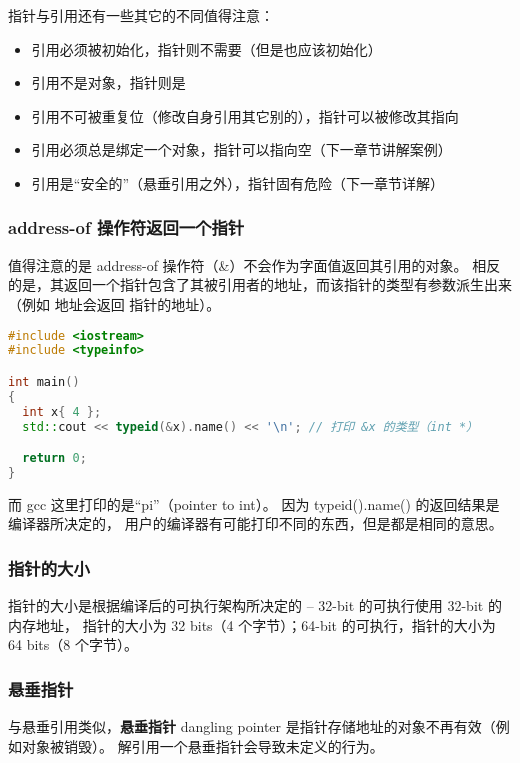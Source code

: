 \documentclass[../../LearnCpp.tex]{subfiles}
\begin{document}
指针与引用还有一些其它的不同值得注意：

\begin{itemize}
  \item 引用必须被初始化，指针则不需要（但是也应该初始化）
  \item 引用不是对象，指针则是
  \item 引用不可被重复位（修改自身引用其它别的），指针可以被修改其指向
  \item 引用必须总是绑定一个对象，指针可以指向空（下一章节讲解案例）
  \item 引用是“安全的”（悬垂引用之外），指针固有危险（下一章节详解）
\end{itemize}

\subsubsection*{address-of 操作符返回一个指针}

值得注意的是 address-of 操作符（\&）不会作为字面值返回其引用的对象。
相反的是，其返回一个指针包含了其被引用者的地址，而该指针的类型有参数派生出来（例如  地址会返回  指针的地址）。

\begin{lstlisting}[language=C++]
#include <iostream>
#include <typeinfo>

int main()
{
  int x{ 4 };
  std::cout << typeid(&x).name() << '\n'; // 打印 &x 的类型（int *）

  return 0;
}
\end{lstlisting}

而 gcc 这里打印的是“pi”（pointer to int）。
因为 typeid().name() 的返回结果是编译器所决定的，
用户的编译器有可能打印不同的东西，但是都是相同的意思。

\subsubsection*{指针的大小}

指针的大小是根据编译后的可执行架构所决定的 -- 32-bit 的可执行使用 32-bit 的内存地址，
指针的大小为 32 bits（4 个字节）；64-bit 的可执行，指针的大小为 64 bits（8 个字节）。

\subsubsection*{悬垂指针}

与悬垂引用类似，\textbf{悬垂指针} dangling pointer 是指针存储地址的对象不再有效（例如对象被销毁）。
解引用一个悬垂指针会导致未定义的行为。
\end{document}
